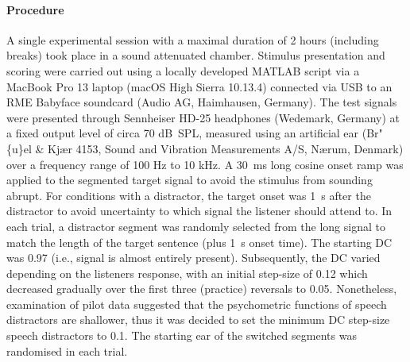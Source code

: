 \documentclass[a4paper, twoside]{templates/ociamthesis}
\begin{document}
\hypertarget{procedure}{%
\paragraph{Procedure}\label{procedure}}

A single experimental session with a maximal duration of 2 hours (including breaks) took place in a sound attenuated chamber. Stimulus presentation and scoring were carried out using a locally developed MATLAB script via a MacBook Pro 13 laptop (macOS High Sierra 10.13.4) connected via USB to an RME Babyface soundcard (Audio AG, Haimhausen, Germany). The test signals were presented through Sennheiser HD-25 headphones (Wedemark, Germany) at a fixed output level of circa 70 dB~SPL, measured using an artificial ear (Br"\{u\}el \& Kjær 4153, Sound and Vibration Measurements A/S, Nærum, Denmark) over a frequency range of 100 Hz to 10 kHz. A 30~ms long cosine onset ramp was applied to the segmented target signal to avoid the stimulus from sounding abrupt. For conditions with a distractor, the target onset was 1~s after the distractor to avoid uncertainty to which signal the listener should attend to. In each trial, a distractor segment was randomly selected from the long signal to match the length of the target sentence (plus 1~s onset time). The starting DC was 0.97 (i.e., signal is almost entirely present). Subsequently, the DC varied depending on the listeners response, with an initial step-size of 0.12 which decreased gradually over the first three (practice) reversals to 0.05. Nonetheless, examination of pilot data suggested that the psychometric functions of speech distractors are shallower, thus it was decided to set the minimum DC step-size speech distractors to 0.1. The starting ear of the switched segments was randomised in each trial.\\
\end{document}
